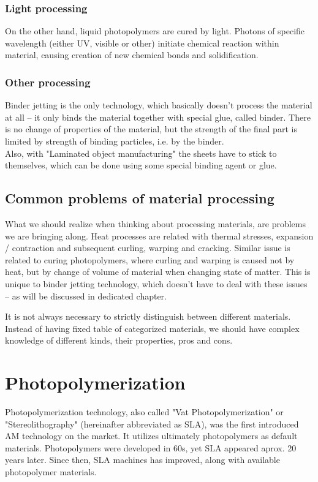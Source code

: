 \documentclass[a4paper, 11pt, reqno]{report}
\begin{document}
\subsection{Light processing}
On the other hand, liquid photopolymers are cured by light. Photons of specific wavelength (either UV, visible or other) initiate chemical reaction within material, causing creation of new chemical bonds and solidification.
\subsection{Other processing}
Binder jetting is the only technology, which basically doesn't process the material at all – it only binds the material together with special glue, called binder. There is no change of properties of the material, but the strength of the final part is limited by strength of binding particles, i.e. by the binder.\\
Also, with "Laminated object manufacturing" the sheets have to stick to themselves, which can be done using some special binding agent or glue.

\section{Common problems of material processing}
What we should realize when thinking about processing materials, are problems we are bringing along. Heat processes are related with thermal stresses, expansion / contraction and subsequent curling, warping and cracking. Similar issue is related to curing photopolymers, where curling and warping is caused not by heat, but by change of volume of material when changing state of matter. This is unique to binder jetting technology, which doesn't have to deal with these issues – as will be discussed in dedicated chapter.

	It is not always necessary to strictly distinguish between different materials. Instead of having fixed table of categorized materials, we should have complex knowledge of different kinds, their properties, pros and cons. 

\chapter{Photopolymerization}
Photopolymerization technology, also called "Vat Photopolymerization" or "Stereolithography" (hereinafter abbreviated as SLA), was the first introduced AM technology on the market. It utilizes ultimately photopolymers as default materials. Photopolymers were developed in 60s, yet SLA appeared aprox. 20 years later. Since then, SLA machines has improved, along with available photopolymer materials.
\end{document}
